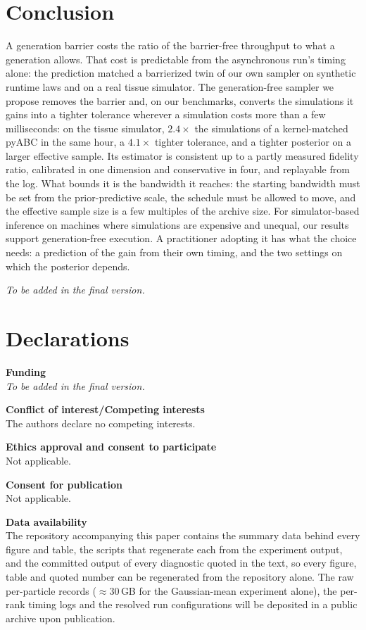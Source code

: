 \documentclass[pdflatex,sn-mathphys-num]{sn-jnl}
\theoremstyle{plain}
\theoremstyle{definition}
\begin{document}
\section{Conclusion}\label{sec:conclusion}
A generation barrier costs the ratio of the barrier-free throughput to what a generation allows. That cost is predictable from the asynchronous run's timing alone: the prediction matched a barrierized twin of our own sampler on synthetic runtime laws and on a real tissue simulator. The generation-free sampler we propose removes the barrier and, on our benchmarks, converts the simulations it gains into a tighter tolerance wherever a simulation costs more than a few milliseconds: on the tissue simulator, $2.4\times$ the simulations of a kernel-matched pyABC in the same hour, a $4.1\times$ tighter tolerance, and a tighter posterior on a larger effective sample. Its estimator is consistent up to a partly measured fidelity ratio, calibrated in one dimension and conservative in four, and replayable from the log. What bounds it is the bandwidth it reaches: the starting bandwidth must be set from the prior-predictive scale, the schedule must be allowed to move, and the effective sample size is a few multiples of the archive size. For simulator-based inference on machines where simulations are expensive and unequal, our results support generation-free execution. A practitioner adopting it has what the choice needs: a prediction of the gain from their own timing, and the two settings on which the posterior depends.

\emph{To be added in the final version.}

\section*{Declarations}
\textbf{Funding} \\
\emph{To be added in the final version.}

\textbf{Conflict of interest/Competing interests} \\
The authors declare no competing interests.

\textbf{Ethics approval and consent to participate} \\
Not applicable.

\textbf{Consent for publication} \\
Not applicable.

\textbf{Data availability} \\
The repository accompanying this paper contains the summary data behind every figure and table, the scripts that regenerate each from the experiment output, and the committed output of every diagnostic quoted in the text, so every figure, table and quoted number can be regenerated from the repository alone. The raw per-particle records (${\approx}30$\,GB for the Gaussian-mean experiment alone), the per-rank timing logs and the resolved run configurations will be deposited in a public archive upon publication.
\end{document}
